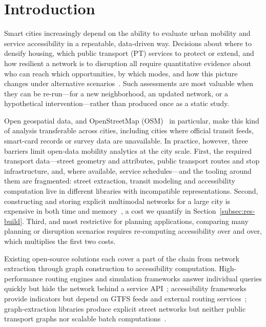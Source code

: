 \documentclass[smartcities,article,submit,moreauthors]{Definitions/mdpi}
\begin{document}
    \section{Introduction}
    \label{sec:introduction}

    Smart cities increasingly depend on the ability to evaluate urban mobility and service accessibility
    in a repeatable, data-driven way.
    Decisions about where to densify housing, which public transport (PT) services to protect or extend,
    and how resilient a network is to disruption all require quantitative evidence about who can reach
    which opportunities, by which modes, and how this picture changes under alternative
    scenarios~\cite{zini2024competitiveness,gumina2026mapping}.
    Such assessments are most valuable when they can be re-run---for a new neighborhood, an updated
    network, or a hypothetical intervention---rather than produced once as a static study.

    Open geospatial data, and OpenStreetMap (OSM)~\cite{arsanjani2015osm} in particular, make this kind
    of analysis transferable across cities, including cities where official transit feeds, smart-card
    records or survey data are unavailable.
    In practice, however, three barriers limit open-data mobility analytics at the city scale.
    First, the required transport data---street geometry and attributes, public transport routes and
    stop infrastructure, and, where available, service schedules---and the tooling around them are
    fragmented: street extraction, transit modeling and accessibility computation live in different
    libraries with incompatible representations.
    Second, constructing and storing explicit multimodal networks for a large city is expensive in both
    time and memory~\cite{staudt2016networkit,benchmark_graphtools}, a cost we quantify in
    Section~\ref{subsec:res-build}.
    Third, and most restrictive for planning applications, comparing many planning or disruption
    scenarios requires re-computing accessibility over and over, which multiplies the first two costs.

    Existing open-source solutions each cover a part of the chain from network extraction through
    graph construction to accessibility computation.
    High-performance routing engines and simulation frameworks answer individual queries quickly but
    hide the network behind a service API~\cite{osrm,otp,graphhopper,valhalla}; accessibility frameworks
    provide indicators but depend on GTFS feeds and external routing
    services~\cite{blanchard2017urbanaccess,foti2014pandana,gumina2026mapping}; graph-extraction
    libraries produce explicit street networks but neither public transport graphs nor scalable batch
    computations~\cite{boeing2025osmnx,pyrosm_docs}.
\end{document}
